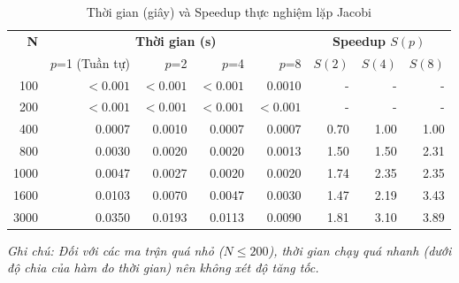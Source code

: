 \begin{table}[H]
  \centering
  \caption{Thời gian (giây) và Speedup thực nghiệm lặp Jacobi}
  \label{tab:jacobi_benchmark}
  \vspace{0.2cm}
  \small
  \begin{tabular}{r|rrrr|rrr}
    \toprule
    \textbf{N} & \multicolumn{4}{c|}{\textbf{Thời gian (s)}} & \multicolumn{3}{c}{\textbf{Speedup $S(p)$}} \\
               & $p$=1 (Tuần tự) & $p$=2 & $p$=4 & $p$=8  & $S(2)$ & $S(4)$ & $S(8)$ \\
    \midrule
    100        & $<0.001$ & $<0.001$ & $<0.001$ & 0.0010  & -      & -      & -      \\
    200        & $<0.001$ & $<0.001$ & $<0.001$ & $<0.001$ & -      & -      & -      \\
    400        & 0.0007   & 0.0010   & 0.0007   & 0.0007  & 0.70   & 1.00   & 1.00   \\
    800        & 0.0030   & 0.0020   & 0.0020   & 0.0013  & 1.50   & 1.50   & 2.31   \\
    1000       & 0.0047   & 0.0027   & 0.0020   & 0.0020  & 1.74   & 2.35   & 2.35   \\
    1600       & 0.0103   & 0.0070   & 0.0047   & 0.0030  & 1.47   & 2.19   & 3.43   \\
    3000       & 0.0350   & 0.0193   & 0.0113   & 0.0090  & 1.81   & 3.10   & 3.89   \\
    \bottomrule
  \end{tabular}
\end{table}
\textit{Ghi chú: Đối với các ma trận quá nhỏ ($N \le 200$), thời gian chạy quá nhanh (dưới độ chia của hàm đo thời gian) nên không xét độ tăng tốc.}

